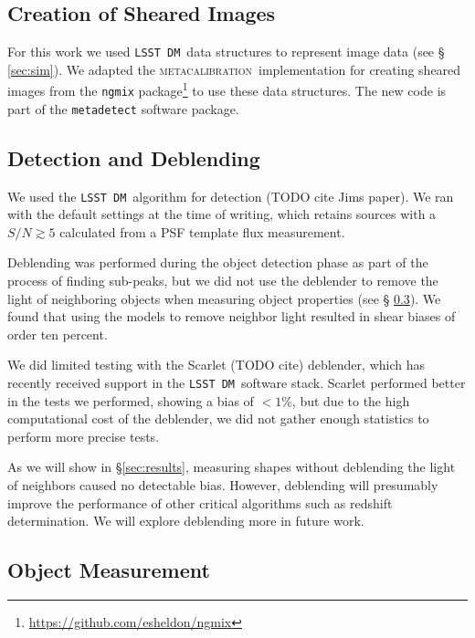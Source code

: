 \documentclass[iop, twocolappendix, appendixfloats, numberedappendix, apj]{hackemulateapj}
\newcommand{\dm}{\texttt{LSST DM}}
\newcommand{\mcal}{\textsc{metacalibration}}
\begin{document}
\subsection{Creation of Sheared Images} \label{sec:mdet:sheared}

For this work we used \dm\ data structures to represent image data (see \S
\ref{sec:sim}).  We adapted the \mcal\ implementation for creating sheared
images from the \texttt{ngmix}
package\footnote{\url{https://github.com/esheldon/ngmix}} to use these data
structures.  The new code is part of the \texttt{metadetect} software package.


\subsection{Detection and Deblending} \label{sec:mdet:detect}

We used the \dm\ algorithm for detection (TODO cite Jims paper).  We ran with
the default settings at the time of writing, which retains sources with a
$S/N \gtrsim 5$ calculated from a PSF template flux measurement.

Deblending was performed during the object detection phase as part of the
process of finding sub-peaks, but we did not use the deblender to remove the
light of neighboring objects when measuring object properties (see \S
\ref{sec:mdet:meas}).  We found that using the models to remove neighbor light
resulted in shear biases of order ten percent.

We did limited testing with the Scarlet (TODO cite) deblender, which has
recently received support in the \dm\ software stack. Scarlet performed better
in the tests we performed, showing a bias of $< 1$\%, but due to the high
computational cost of the deblender, we did not gather enough statistics to
perform more precise tests.

As we will show in \S \ref{sec:results}, measuring shapes without deblending
the light of neighbors caused no detectable bias.  However, deblending will
presumably improve the performance of other critical algorithms such as 
redshift determination.  We will explore deblending more in future work.

\subsection{Object Measurement} \label{sec:mdet:meas}
\end{document}
